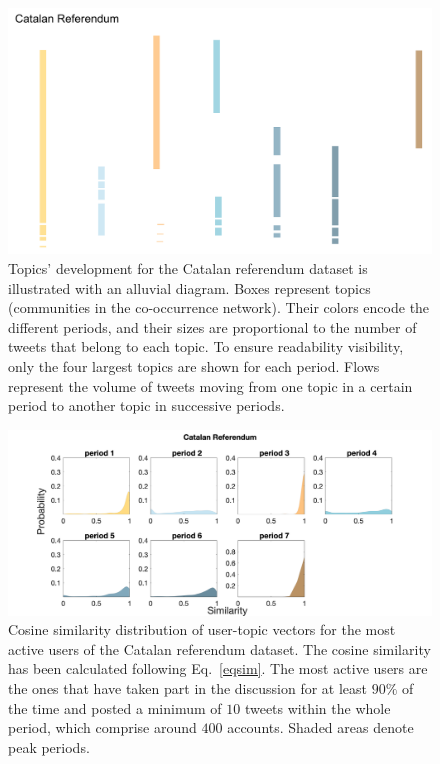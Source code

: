 \begin{figure}[t]

    \centering
   \includegraphics[width=1.05\textwidth]{figures/chp3/fig5.pdf}
   
    \caption[Alluvial diagram of topic sizes]{Topics' development for the Catalan referendum dataset is illustrated with an alluvial diagram. Boxes represent topics (communities in the co-occurrence network). Their colors encode the different periods, and their sizes are proportional to the number of tweets that belong to each topic. To ensure readability visibility, only the four largest topics are shown for each period. Flows represent the volume of tweets moving from one topic in a certain period to another topic in successive periods.}
   \label{chp3:fig:5}
\end{figure}

\begin{figure}[t]
    \centering
   \includegraphics[width=1.05\textwidth]{figures/chp3/similarity_catalonia_nolog.png}
   
    \caption[Cosine similarity distribution of user-topic vectors]{Cosine similarity distribution of user-topic vectors for the most active users of the Catalan referendum dataset. The cosine similarity has been calculated following Eq.~\ref{eqsim}. The most active users are the ones that have taken part in the discussion for at least $90\%$ of the time and posted a minimum of $10$ tweets within the whole period, which comprise around $400$ accounts. Shaded areas denote peak periods.}
   \label{chp3:fig:6}
\end{figure}

